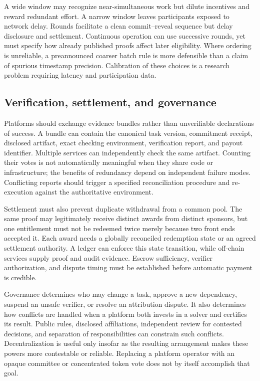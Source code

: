 \documentclass[11pt,a4paper]{article}
\begin{document}
A wide window may recognize near-simultaneous work but dilute incentives and reward redundant effort. A narrow window leaves participants exposed to network delay. Rounds facilitate a clean commit--reveal sequence but delay disclosure and settlement. Continuous operation can use successive rounds, yet must specify how already published proofs affect later eligibility. Where ordering is unreliable, a preannounced coarser batch rule is more defensible than a claim of spurious timestamp precision. Calibration of these choices is a research problem requiring latency and participation data.

\subsection{Verification, settlement, and governance}
Platforms should exchange evidence bundles rather than unverifiable declarations of success. A bundle can contain the canonical task version, commitment receipt, disclosed artifact, exact checking environment, verification report, and payout identifier. Multiple services can independently check the same artifact. Counting their votes is not automatically meaningful when they share code or infrastructure; the benefits of redundancy depend on independent failure modes. Conflicting reports should trigger a specified reconciliation procedure and re-execution against the authoritative environment.

Settlement must also prevent duplicate withdrawal from a common pool. The same proof may legitimately receive distinct awards from distinct sponsors, but one entitlement must not be redeemed twice merely because two front ends accepted it. Each award needs a globally reconciled redemption state or an agreed settlement authority. A ledger can enforce this state transition, while off-chain services supply proof and audit evidence. Escrow sufficiency, verifier authorization, and dispute timing must be established before automatic payment is credible.

Governance determines who may change a task, approve a new dependency, suspend an unsafe verifier, or resolve an attribution dispute. It also determines how conflicts are handled when a platform both invests in a solver and certifies its result. Public rules, disclosed affiliations, independent review for contested decisions, and separation of responsibilities can constrain such conflicts. Decentralization is useful only insofar as the resulting arrangement makes these powers more contestable or reliable. Replacing a platform operator with an opaque committee or concentrated token vote does not by itself accomplish that goal.
\end{document}
